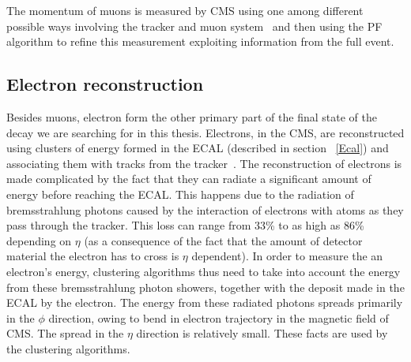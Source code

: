 The momentum of muons is measured by CMS using one among different possible ways involving the tracker and muon system~\cite{muon_recon2012} and then using the PF algorithm to refine this measurement exploiting information from the full event.



\subsection{Electron reconstruction}
\label{e_recon}
Besides muons, electron form the other primary part of the final state of the decay we are searching for in this thesis. Electrons, in the CMS, are reconstructed using clusters of energy formed in the ECAL (described in section ~\ref{Ecal}) and associating them with tracks from the tracker~\cite{e_recon}. The reconstruction of electrons is made complicated by the fact that they can radiate a significant amount of energy before reaching the ECAL. This happens due to the radiation of bremsstrahlung photons caused by the interaction of electrons with atoms as they pass through the tracker. This loss can range from 33\% to as high as 86\% depending on $\eta$ (as a consequence of the fact that the amount of detector material the electron has to cross is $\eta$ dependent). In order to measure the an electron's energy,  clustering algorithms thus need to take into account the energy from these bremsstrahlung photon showers, together with the deposit made in the ECAL by the electron. The energy from these radiated photons spreads primarily in the $\phi$ direction, owing to bend in electron trajectory in the magnetic field of CMS. The spread in the $\eta$ direction is relatively small. These facts are used by the clustering algorithms.


